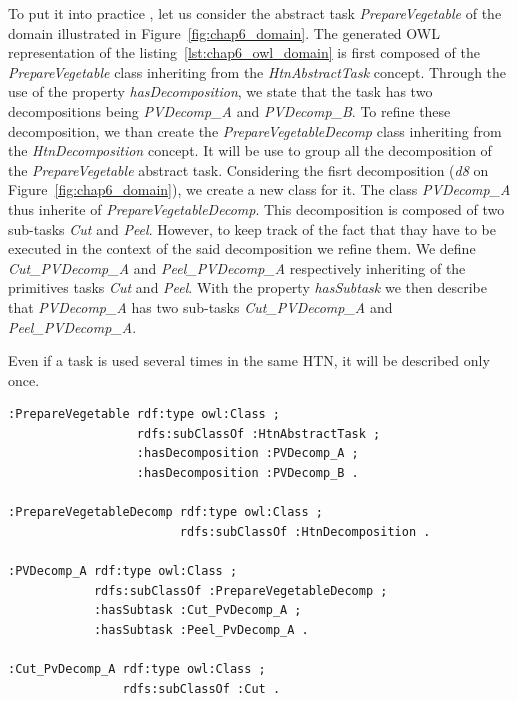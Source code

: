 To put it into practice , let us consider the abstract task \textit{PrepareVegetable} of the domain illustrated in Figure~\ref{fig:chap6_domain}. The generated OWL representation of the listing~\ref{lst:chap6_owl_domain} is first composed of the \textit{PrepareVegetable} class inheriting from the \textit{HtnAbstractTask} concept. Through the use of the property \textit{hasDecomposition}, we state that the task has two decompositions being \textit{PVDecomp\_A} and \textit{PVDecomp\_B}. To refine these decomposition, we than create the \textit{PrepareVegetableDecomp} class inheriting from the \textit{HtnDecomposition} concept. It will be use to group all the decomposition of the \textit{PrepareVegetable} abstract task. Considering the fisrt decomposition (\textit{d8} on Figure~\ref{fig:chap6_domain}), we create a new class for it. The class \textit{PVDecomp\_A} thus inherite of \textit{PrepareVegetableDecomp}. This decomposition is composed of two sub-tasks \textit{Cut} and \textit{Peel}.  However, to keep track of the fact that thay have to be executed in the context of the said decomposition we refine them. We define \textit{Cut\_PVDecomp\_A} and \textit{Peel\_PVDecomp\_A} respectively inheriting of the primitives tasks \textit{Cut} and \textit{Peel}. With the property \textit{hasSubtask} we then describe that \textit{PVDecomp\_A} has two sub-tasks \textit{Cut\_PVDecomp\_A} and \textit{Peel\_PVDecomp\_A}.

Even if a task is used several times in the same HTN, it will be described only once.

\begin{lstlisting}[frame=single, basicstyle=\scriptsize\ttfamily, label={lst:chap6_owl_domain}, caption={Description of the abstract task PrepareVegetable and one of its decomposition in the OWL language using the Turle syntax.},captionpos=b, style=OwlTurtle]
:PrepareVegetable rdf:type owl:Class ;
                  rdfs:subClassOf :HtnAbstractTask ;
                  :hasDecomposition :PVDecomp_A ;
                  :hasDecomposition :PVDecomp_B .

:PrepareVegetableDecomp rdf:type owl:Class ;
                        rdfs:subClassOf :HtnDecomposition .

:PVDecomp_A rdf:type owl:Class ;
            rdfs:subClassOf :PrepareVegetableDecomp ;
            :hasSubtask :Cut_PvDecomp_A ;
            :hasSubtask :Peel_PvDecomp_A .

:Cut_PvDecomp_A rdf:type owl:Class ;
                rdfs:subClassOf :Cut .
\end{lstlisting}

